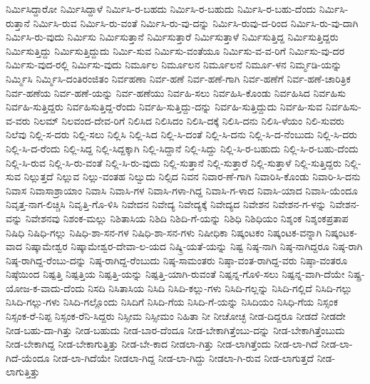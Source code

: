 ನಿರ್ಮಿಸಿದ್ದಾರೋ
ನಿರ್ಮಿಸಿದ್ದಾಳೆ
ನಿರ್ಮಿಸಿ-ರ-ಬಹದು
ನಿರ್ಮಿಸಿ-ರ-ಬಹುದು
ನಿರ್ಮಿಸಿ-ರ-ಬಹು-ದೆಂದು
ನಿರ್ಮಿಸಿ-ರುತ್ತಾನೆ
ನಿರ್ಮಿಸಿ-ರುವ
ನಿರ್ಮಿಸಿ-ರು-ವಂತೆ
ನಿರ್ಮಿಸಿ-ರು-ವು-ದನ್ನು
ನಿರ್ಮಿಸಿ-ರುವು-ದ-ರಿಂದ
ನಿರ್ಮಿಸಿ-ರು-ವು-ದಾಗಿ
ನಿರ್ಮಿಸಿ-ರು-ವುದು
ನಿರ್ಮಿಸು
ನಿರ್ಮಿಸುತ್ತಾನೆ
ನಿರ್ಮಿಸುತ್ತಾರೆ
ನಿರ್ಮಿಸುತ್ತಾಳೆ
ನಿರ್ಮಿಸುತ್ತಿದ್ದ
ನಿರ್ಮಿಸುತ್ತಿದ್ದರು
ನಿರ್ಮಿಸುತ್ತಿದ್ದು
ನಿರ್ಮಿಸುತ್ತಿದ್ದುದು
ನಿರ್ಮಿ-ಸುವ
ನಿರ್ಮಿಸು-ವಂತೆಯೂ
ನಿರ್ಮಿಸು-ವ-ವ-ರಿಗೆ
ನಿರ್ಮಿಸು-ವು-ದರ
ನಿರ್ಮಿಸು-ವುದ-ರಲ್ಲಿ
ನಿರ್ಮಿಸು-ವುದು
ನಿರ್ಮೂಲ
ನಿರ್ಮೂಲನ
ನಿರ್ಮೂಲನೆ
ನಿರ್ಮೂ-ಳನ
ನಿರ್ಮ್ಮಡಿ-ಯನ್ನು
ನಿರ್ಮ್ಮಿಸಿ
ನಿರ್ಮ್ಮಿಸಿ-ದಂತಿರಂಜಿತಂ
ನಿರ್ವಹಣಾ
ನಿರ್ವ-ಹಣೆ
ನಿರ್ವ-ಹಣೆ-ಗಾಗಿ
ನಿರ್ವ-ಹಣೆಗೆ
ನಿರ್ವ-ಹಣೆ-ಚಾರಿತ್ರಿಕ
ನಿರ್ವ-ಹಣೆಯ
ನಿರ್ವ-ಹಣೆ-ಯನ್ನು
ನಿರ್ವ-ಹಣೆಯು
ನಿರ್ವಹಿ-ಸಲು
ನಿರ್ವಹಿಸಿ-ಕೊಂಡು
ನಿರ್ವಹಿಸಿದ
ನಿರ್ವಹಿಸು
ನಿರ್ವಹಿ-ಸುತ್ತಿದ್ದರು
ನಿರ್ವಹಿಸುತ್ತಿದ್ದ-ರೆಂದು
ನಿರ್ವಹಿ-ಸುತ್ತಿದ್ದು-ದನ್ನು
ನಿರ್ವಹಿ-ಸುತ್ತಿದ್ದುದು
ನಿರ್ವಹಿ-ಸುವ
ನಿರ್ವಹಿಸು-ವ-ವರು
ನಿಲಮ್
ನಿಲವಂದ-ದೇವ-ರಿಗೆ
ನಿಲಿಸಿದ
ನಿಲಿಸಿದಂ
ನಿಲಿಸಿ-ದಕ್ಕೆ
ನಿಲಿಸಿ-ದನು
ನಿಲಿಸಿ-ಳೆಯಂ
ನಿಲಿ-ಸುವರು
ನಿಲೆವು
ನಿಲ್ಲಿ-ಸ-ದರು
ನಿಲ್ಲಿ-ಸಲು
ನಿಲ್ಲಿಸಿ
ನಿಲ್ಲಿ-ಸಿದ
ನಿಲ್ಲಿ-ಸಿ-ದಂತೆ
ನಿಲ್ಲಿ-ಸಿ-ದನು
ನಿಲ್ಲಿ-ಸಿ-ದ-ನೆಂಬುದು
ನಿಲ್ಲಿ-ಸಿ-ದರು
ನಿಲ್ಲಿ-ಸಿ-ದ-ರೆಂದು
ನಿಲ್ಲಿ-ಸಿದ್ದ
ನಿಲ್ಲಿ-ಸಿದ್ದಕ್ಕಾಗಿ
ನಿಲ್ಲಿ-ಸಿದ್ದಾನೆ
ನಿಲ್ಲಿ-ಸಿದ್ದು
ನಿಲ್ಲಿ-ಸಿ-ರ-ಬಹುದು
ನಿಲ್ಲಿ-ಸಿ-ರ-ಬಹು-ದೆಂದು
ನಿಲ್ಲಿ-ಸಿ-ರುವ
ನಿಲ್ಲಿ-ಸಿ-ರು-ವಂತೆ
ನಿಲ್ಲಿ-ಸಿ-ರು-ವುದು
ನಿಲ್ಲಿ-ಸುತ್ತಾನೆ
ನಿಲ್ಲಿ-ಸುತ್ತಾರೆ
ನಿಲ್ಲಿ-ಸುತ್ತಾಳೆ
ನಿಲ್ಲಿ-ಸುತ್ತಿದ್ದರು
ನಿಲ್ಲಿ-ಸುವ
ನಿಲ್ಲುತ್ತದೆ
ನಿಲ್ಲುವ
ನಿಲ್ಲು-ವಂತಹ
ನಿಲ್ವುದು
ನಿಲ್ಸಿದ
ನಿವನ
ನಿವಾರ-ಣೆ-ಗಾಗಿ
ನಿವಾರಿಸಿ-ಕೊಂಡು
ನಿವಾರಿ-ಸಿ-ದನು
ನಿವಾಸ
ನಿವಾಸಾಶ್ರಾಯಾಂ
ನಿವಾಸಿ
ನಿವಾಸಿ-ಗಳ
ನಿವಾಸಿ-ಗಳಾ-ಗಿದ್ದ
ನಿವಾಸಿ-ಗ-ಳಾದ
ನಿವಾಸಿ-ಯಾದ
ನಿವಾಸಿ-ಯೆಂದೂ
ನಿವೃತ್ತ-ನಾಗ-ಲಿಚ್ಚಿಸಿ
ನಿವೃತ್ತಿ-ಗೊ-ಳಿಸಿ
ನಿವೇದನ
ನಿವೇದ್ಯ
ನಿವೇದ್ಯಕ್ಕೆ
ನಿವೇದ್ಯದ
ನಿವೇಶನ
ನಿವೇಶನ-ಗ-ಳನ್ನು
ನಿವೇಶನ-ವನ್ನು
ನಿವೇಶನವು
ನಿಶಂಕ-ಮಲ್ಲು
ನಿಶಿತಾಸಿಯ
ನಿಶಿದಿ
ನಿಶಿದಿ-ಗೆ-ಯನ್ನು
ನಿಶಿಧಿ
ನಿಶಿಧಿಯಂ
ನಿಶ್ಶಂಕ
ನಿಶ್ಶಂಕಪ್ರತಾಪ
ನಿಷಿಧಿ
ನಿಷಿಧಿ-ಗಲ್ಲು
ನಿಷಿಧಿ-ಶಾ-ಸನ-ಗಳ
ನಿಷಿಧಿ-ಶಾ-ಸನ-ಗಳು
ನಿಷೀಧಿಕಾ
ನಿಷ್ಕಂಟಕಂ
ನಿಷ್ಕಂಟಕ-ವನ್ನಾಗಿ
ನಿಷ್ಕಂಟಕ-ವಾದ
ನಿಷ್ಕಾಮೇಶ್ವರ
ನಿಷ್ಕಾಮೇಶ್ವರ-ದೇವಾ-ಲ-ಯದ
ನಿಷ್ಕ್ರಿ-ಯತೆ-ಯನ್ನು
ನಿಷ್ಟ
ನಿಷ್ಠ-ನಾಗಿ
ನಿಷ್ಠ-ನಾಗಿದ್ದರೂ
ನಿಷ್ಠ-ರಾಗಿ
ನಿಷ್ಠ-ರಾಗಿದ್ದ-ರೆಂಬು-ದನ್ನು
ನಿಷ್ಠ-ರಾಗಿದ್ದ-ರೆಂಬುದು
ನಿಷ್ಠ-ಸಾಮಂತರು
ನಿಷ್ಠಾ-ವಂತ-ರಾಗಿದ್ದ-ವರು
ನಿಷ್ಠಾ-ವಂತರೂ
ನಿಷ್ಠೆಯಿಂದ
ನಿಷ್ಪತ್ತಿ
ನಿಷ್ಪತ್ತಿಯ
ನಿಷ್ಪತ್ತಿ-ಯನ್ನು
ನಿಷ್ಪತ್ತಿ-ಯಾಗಿ-ರುವಂತೆ
ನಿಷ್ಪನ್ನ-ಗೊಳಿ-ಸಲು
ನಿಷ್ಪನ್ನ-ವಾಗಿ-ದೆಯೇ
ನಿಷ್ಪ್ರ-ಯೋಜ-ಕ-ವಾದು-ದೆಂದು
ನಿಸದಿ
ನಿಸಿತಾಸಿಯ
ನಿಸಿದಿ
ನಿಸಿದಿ-ಕಲ್ಲು-ಗಳು
ನಿಸಿದಿ-ಗಲ್ಲನ್ನು
ನಿಸಿದಿ-ಗಲ್ಲಿದೆ
ನಿಸಿದಿ-ಗಲ್ಲು
ನಿಸಿದಿ-ಗಲ್ಲು-ಗಳು
ನಿಸಿದಿ-ಗಲ್ಲೊಂದು
ನಿಸಿದಿಗೆ
ನಿಸಿದಿ-ಗೆಯ
ನಿಸಿದಿ-ಗೆ-ಯನ್ನು
ನಿಸಿದಿಯಂ
ನಿಸಿಧಿ-ಗೆಯ
ನಿಸ್ಸಂಕ
ನಿಸ್ಸಂಕ-ರೆ-ನಿಪ್ಪ
ನಿಸ್ಸಂಕ-ರೆನಿ-ಸಿದ್ದರು
ನಿಸ್ಸೀಮ
ನಿಸ್ಸೀಮಂ
ನಿಹಿತಾ
ನೀ
ನೀಚೋಚ್ಛ
ನೀಡ-ದಿದ್ದರೂ
ನೀಡದೆ
ನೀಡದೇ
ನೀಡ-ಬಹು-ದಾ-ಗಿತ್ತು
ನೀಡ-ಬಹುದು
ನೀಡ-ಬಾರ-ದೆಂದೂ
ನೀಡ-ಬೇಕಾಗಿತ್ತೆಂಬು-ದನ್ನು
ನೀಡ-ಬೇಕಾಗಿತ್ತೆಂಬುದು
ನೀಡ-ಬೇಕಾಗಿದ್ದ
ನೀಡ-ಬೇಕಾಗುತ್ತಿತ್ತು
ನೀಡ-ಬೇ-ಕಾದ
ನೀಡಲಾ-ಗಿತ್ತು
ನೀಡ-ಲಾಗಿತ್ತೆಂದು
ನೀಡ-ಲಾ-ಗಿದೆ
ನೀಡ-ಲಾ-ಗಿದೆ-ಯೆಂದೂ
ನೀಡ-ಲಾ-ಗಿದೆಯೇ
ನೀಡಲಾ-ಗಿದ್ದ
ನೀಡ-ಲಾ-ಗಿದ್ದು
ನೀಡಲಾ-ಗಿ-ರುವ
ನೀಡ-ಲಾಗುತ್ತದೆ
ನೀಡ-ಲಾಗುತ್ತಿತ್ತು
